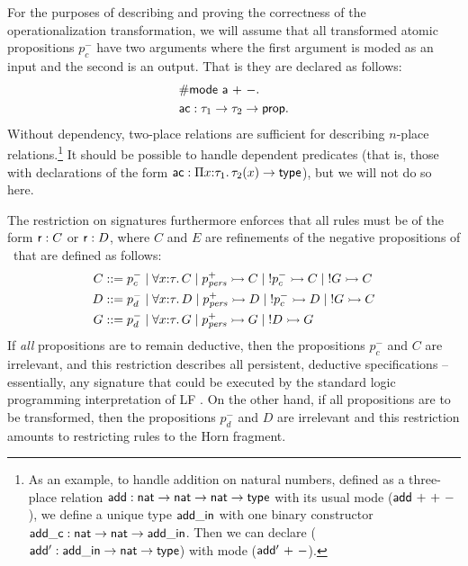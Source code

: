 For the purposes of describing and proving the correctness of the
operationalization transformation, we will assume that all transformed
atomic propositions $p_c^-$ have two arguments where the first
argument is moded as an input and the second is an output. That is
they are declared as follows:
\begin{align*}
& {\sf \#mode~a~{+}~{-}}.\\
& {\sf ac} : \tau_1 \rightarrow \tau_2 \rightarrow {\sf prop}.
\end{align*}
Without dependency, two-place relations are sufficient for describing
$n$-place relations.\footnote{As an example, to handle addition on
  natural numbers, defined as a three-place relation ${\sf add} : {\sf
    nat} \rightarrow {\sf nat} \rightarrow {\sf nat} \rightarrow {\sf
    type}$ with its usual mode (${\sf add}~{+}~{+}~{-}$), we define a
  unique type ${\sf add\_in}$ with one binary constructor ${\sf
    add\_c} : {\sf nat} \rightarrow {\sf nat} \rightarrow {\sf
    add\_in}$. Then we can declare (${\sf add'} : {\sf add\_in}
  \rightarrow {\sf nat} \rightarrow {\sf type}$) with mode (${\sf
    add'}~{+}~{-}$).}  It should be possible to handle dependent
predicates (that is, those with declarations of the form ${\sf ac} :
\Pi x{:}\tau_1.\,\tau_2(x) \rightarrow {\sf type}$), but we will not do
so here.

The restriction on signatures furthermore enforces that all rules must
be of the form ${\sf r} : C$ or ${\sf r} : D$, where $C$ and $E$ are
refinements of the negative propositions of \sls~that are defined as
follows:
\begin{align*}
C & ::= p^-_{c} 
    \mid \forall x{:}\tau.\, C
    \mid p^+_{\it pers} \rightarrowtail C
    \mid {!}p^-_c \rightarrowtail C
    \mid {!}G \rightarrowtail C \\
D & ::= p^-_{d}
    \mid \forall x{:}\tau.\, D
    \mid p^+_{\it pers} \rightarrowtail D
    \mid {!}p^-_c \rightarrowtail D
    \mid {!}G \rightarrowtail C \\
G & ::= p^-_d 
    \mid \forall x{:}\tau.\, G
    \mid p^+_{\it pers} \rightarrowtail G
    \mid {!}D \rightarrowtail G
\end{align*}
If {\it all} propositions are to remain deductive, then the
propositions $p^-_c$ and $C$ are irrelevant, and this restriction
describes all persistent, deductive specifications -- essentially, any
signature that could be executed by the standard logic programming
interpretation of LF \cite{pfenning98elf}. On the other hand, if all
propositions are to be transformed, then the propositions $p^-_d$ and
$D$ are irrelevant and this restriction amounts to restricting
rules to the Horn fragment.


